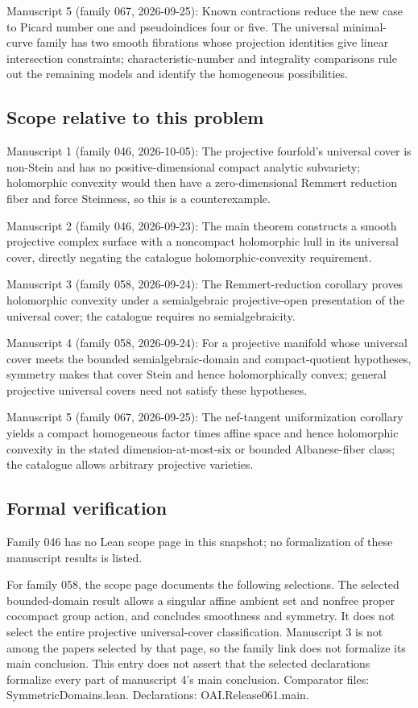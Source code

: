 \documentclass[11pt]{article}
\begin{document}
Manuscript 5 (family 067, 2026-09-25): Known contractions reduce the new case to Picard number one and pseudoindices four or five. The universal minimal-curve family has two smooth fibrations whose projection identities give linear intersection constraints; characteristic-number and integrality comparisons rule out the remaining models and identify the homogeneous possibilities.

\subsection{Scope relative to this problem}
Manuscript 1 (family 046, 2026-10-05): The projective fourfold’s universal cover is non-Stein and has no positive-dimensional compact analytic subvariety; holomorphic convexity would then have a zero-dimensional Remmert reduction fiber and force Steinness, so this is a counterexample.

Manuscript 2 (family 046, 2026-09-23): The main theorem constructs a smooth projective complex surface with a noncompact holomorphic hull in its universal cover, directly negating the catalogue holomorphic-convexity requirement.

Manuscript 3 (family 058, 2026-09-24): The Remmert-reduction corollary proves holomorphic convexity under a semialgebraic projective-open presentation of the universal cover; the catalogue requires no semialgebraicity.

Manuscript 4 (family 058, 2026-09-24): For a projective manifold whose universal cover meets the bounded semialgebraic-domain and compact-quotient hypotheses, symmetry makes that cover Stein and hence holomorphically convex; general projective universal covers need not satisfy these hypotheses.

Manuscript 5 (family 067, 2026-09-25): The nef-tangent uniformization corollary yields a compact homogeneous factor times affine space and hence holomorphic convexity in the stated dimension-at-most-six or bounded Albanese-fiber class; the catalogue allows arbitrary projective varieties.

\subsection{Formal verification}
Family 046 has no Lean scope page in this snapshot; no formalization of these manuscript results is listed.

For family 058, the scope page documents the following selections. The selected bounded-domain result allows a singular affine ambient set and nonfree proper cocompact group action, and concludes smoothness and symmetry. It does not select the entire projective universal-cover classification. Manuscript 3 is not among the papers selected by that page, so the family link does not formalize its main conclusion. This entry does not assert that the selected declarations formalize every part of manuscript 4's main conclusion. Comparator files: SymmetricDomains.lean. Declarations: OAI.Release061.main.
\end{document}
